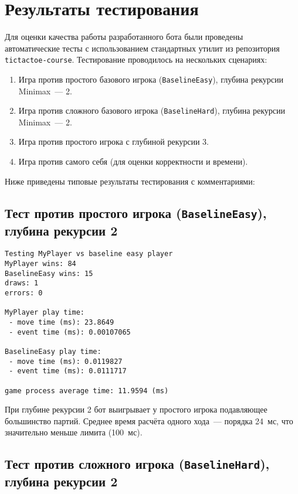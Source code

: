 \section{Результаты тестирования}

Для оценки качества работы разработанного бота были проведены автоматические тесты с использованием стандартных утилит из репозитория \texttt{tictactoe-course}. Тестирование проводилось на нескольких сценариях:

\begin{enumerate}
    \item Игра против простого базового игрока (\texttt{BaselineEasy}), глубина рекурсии Minimax~--- 2.
    \item Игра против сложного базового игрока (\texttt{BaselineHard}), глубина рекурсии Minimax~--- 2.
    \item Игра против простого игрока с глубиной рекурсии 3.
    \item Игра против самого себя (для оценки корректности и времени).
\end{enumerate}

\vspace{0.5em}
Ниже приведены типовые результаты тестирования с комментариями:

\subsection{Тест против простого игрока (\texttt{BaselineEasy}), глубина рекурсии 2}

\begin{lstlisting}[caption={Тест против BaselineEasy, глубина 2},label={lst:test_easy2},numbers=none]
Testing MyPlayer vs baseline easy player
MyPlayer wins: 84
BaselineEasy wins: 15
draws: 1
errors: 0

MyPlayer play time:
 - move time (ms): 23.8649
 - event time (ms): 0.00107065

BaselineEasy play time:
 - move time (ms): 0.0119827
 - event time (ms): 0.0111717

game process average time: 11.9594 (ms)
\end{lstlisting}

При глубине рекурсии 2 бот выигрывает у простого игрока подавляющее большинство партий. Среднее время расчёта одного хода~--- порядка 24~мс, что значительно меньше лимита (100~мс).

\subsection{Тест против сложного игрока (\texttt{BaselineHard}), глубина рекурсии 2}

